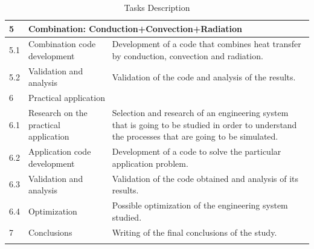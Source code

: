 \begin{longtable}{ | p{1.3cm} | p{3cm} | p{11cm} |}
5 & \multicolumn{2}{|l|}{Combination: Conduction+Convection+Radiation} \\ \hline
5.1 & Combination code development & Development of a code that combines heat transfer by conduction, convection and radiation. \\ \hline
5.2 & Validation and analysis &  Validation of the code and analysis of the results. \\ \hline
6 & \multicolumn{2}{|l|}{Practical application} \\ \hline
6.1 & Research on the practical application & Selection and research of an engineering system that is going to be studied in order to understand the processes that are going to be simulated. \\ \hline
6.2 & Application code development & Development of a code to solve the particular application problem. \\ \hline
6.3 & Validation and analysis &  Validation of the code obtained and analysis of its results. \\ \hline
6.4 & Optimization &  Possible optimization of the engineering system studied. \\ \hline
7 & Conclusions & Writing of the final conclusions of the study. \\ \hline
\caption{Tasks Description}
\label{taskssummary}
\end{longtable}

